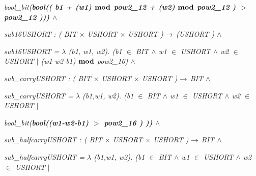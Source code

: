 \documentclass[11pt]{article}
\begin{document}
\begin{sloppypar}
\hspace*{0.40in}\it bool\_bit\rm (\bf bool\rm (\rm ( \it b1 \rm + \rm (\it w1\rm )  $\mod$  \it pow2\_12 \rm + \rm (\it w2\rm )  $\mod$  \it pow2\_12 \rm ) $>$\hspace*{0.10in}\it pow2\_12 \rm )\rm )\hspace*{0.10in}\rm )  $\land$ 

\hspace*{0.20in}

\hspace*{0.20in}\it sub16USHORT \rm : \rm ( \it BIT  $\times$  \it USHORT  $\times$  \it USHORT \rm )  $\fun$  \rm (\it USHORT \rm )  $\land$ 

\hspace*{0.20in}\it sub16USHORT \rm =  $\lambda$  \rm (\it b1\rm , \it w1\rm , \it w2\rm )\rm . \rm (\it b1  $\in$  \it BIT  $\land$  \it w1  $\in$  \it USHORT  $\land$  \it w2  $\in$  \it USHORT\hspace*{0.10in} $\mid$ \rm (\it w1\rm -\it w2\rm -\it b1\rm )  $\mod$ \hspace*{0.10in}\it pow2\_16\hspace*{0.10in}\rm )  $\land$ 

\hspace*{0.20in}

\hspace*{0.20in}\it sub\_carryUSHORT \rm : \rm ( \it BIT  $\times$  \it USHORT  $\times$  \it USHORT \rm )  $\fun$  \it BIT  $\land$ 

\hspace*{0.20in}\it sub\_carryUSHORT \rm =  $\lambda$  \rm (\it b1\rm ,\it w1\rm , \it w2\rm )\rm . \rm (\it b1  $\in$  \it BIT  $\land$  \it w1  $\in$  \it USHORT  $\land$  \it w2  $\in$  \it USHORT\hspace*{0.10in} $\mid$ 

\hspace*{0.40in}\it bool\_bit\rm (\bf bool\rm (\rm (\it w1\rm -\it w2\rm -\it b1\rm ) $>$ \it pow2\_16 \rm ) \rm )\hspace*{0.10in}\rm )  $\land$ 

\hspace*{0.20in}

\hspace*{0.20in}\it sub\_halfcarryUSHORT \rm : \rm ( \it BIT  $\times$  \it USHORT  $\times$  \it USHORT \rm )  $\fun$  \it BIT  $\land$ 

\hspace*{0.20in}\it sub\_halfcarryUSHORT \rm =  $\lambda$  \rm (\it b1\rm ,\it w1\rm , \it w2\rm )\rm . \rm (\it b1  $\in$  \it BIT  $\land$  \it w1  $\in$  \it USHORT  $\land$  \it w2  $\in$  \it USHORT\hspace*{0.10in} $\mid$  


\end{sloppypar}
\end{document}
